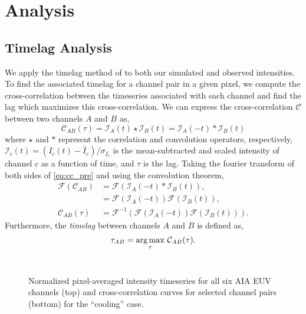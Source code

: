\section{Analysis}\label{analysis}


\subsection{Timelag Analysis}\label{timelag_analysis}

We apply the timelag method of \citet{viall_evidence_2012} to both our simulated and observed intensities. To find the associated timelag for a channel pair in a given pixel, we compute the cross-correlation between the timeseries associated with each channel and find the lag which maximizes this cross-correlation. We can express the cross-correlation $\mathcal{C}$ between two channels $A$ and $B$ as,
\begin{equation}\label{eq:cc_pre}
    \mathcal{C}_{AB}(\tau) = \mathcal{I}_A(t)\star\mathcal{I}_B(t) = \mathcal{I}_A(-t)\ast\mathcal{I}_B(t)
\end{equation}
where $\star$ and $\ast$ represent the correlation and convolution operators, respectively, $\mathcal{I}_c(t)=(I_c(t)-\bar{I}_c)/\sigma_{I_c}$ is the mean-subtracted and scaled intensity of channel $c$ as a function of time, and $\tau$ is the lag. Taking the fourier transform of both sides of \autoref{eq:cc_pre} and using the convolution theorem,
\begin{align}\label{eq:cc}
    \mathcal{F}(\mathcal{C}_{AB}) &= \mathcal{F}(\mathcal{I}_A(-t)\ast\mathcal{I}_B(t)), \nonumber\\
    &= \mathcal{F}(\mathcal{I}_A(-t))\mathcal{F}(\mathcal{I}_B(t)), \nonumber\\
    \mathcal{C}_{AB}(\tau) &= \mathcal{F}^{-1}(\mathcal{F}(\mathcal{I}_A(-t))\mathcal{F}(\mathcal{I}_B(t))).
\end{align}
Furthermore, the \textit{timelag} between channels $A$ and $B$ is defined as,
\begin{equation}
    \tau_{AB} = \argmax_{\tau}\,\mathcal{C}_{AB}(\tau).
\end{equation}
\
\begin{figure}
    \caption{Normalized pixel-averaged intensity timeseries for all six AIA EUV channels (top) and cross-correlation curves for selected channel pairs (bottom) for the ``cooling'' case.}
    \label{fig:correlation_1d}
\end{figure}

